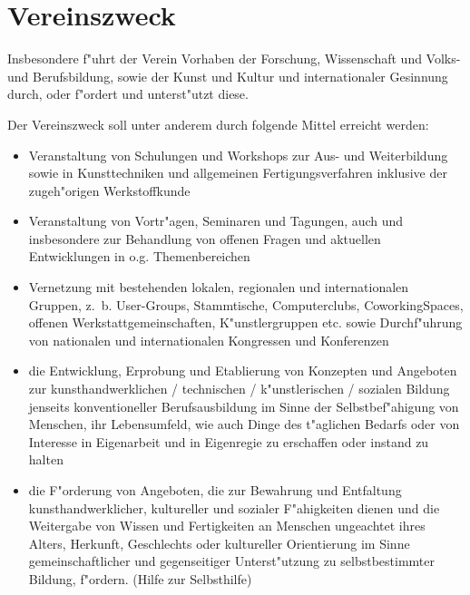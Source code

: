 \documentclass[a5paper, ngerman, 10pt]{scrreprt}
\begin{document}
\section{Vereinszweck}
\begin{compactenum}[(1)]
    \item Insbesondere f"uhrt der Verein Vorhaben der Forschung, Wissenschaft
        und Volks- und Berufsbildung, sowie der Kunst und Kultur und
        internationaler Gesinnung durch, oder f"ordert und unterst"utzt diese.
    \item Der Vereinszweck soll unter anderem durch folgende Mittel erreicht
        werden:
        \begin{itemize}
            \item Veranstaltung von Schulungen und Workshops zur Aus- und
                Weiterbildung sowie in Kunsttechniken und allgemeinen
                Fertigungsverfahren inklusive der zugeh"origen Werkstoffkunde
            \item Veranstaltung von Vortr"agen, Seminaren und Tagungen, auch und
                insbesondere zur Behandlung von offenen Fragen und aktuellen
                Entwicklungen in o.g. Themenbereichen
            \item Vernetzung mit bestehenden lokalen, regionalen und
                internationalen Gruppen, z.~b.  User-Groups, Stammtische,
                Computerclubs, CoworkingSpaces, offenen Werkstattgemeinschaften,
                K"unstlergruppen etc. sowie Durchf"uhrung von nationalen und
                internationalen Kongressen und Konferenzen
            \item die Entwicklung, Erprobung und Etablierung von Konzepten und
                Angeboten zur kunsthandwerklichen / technischen /
                k"unstlerischen / sozialen Bildung jenseits konventioneller
                Berufsausbildung im Sinne der Selbstbef"ahigung von Menschen,
                ihr Lebensumfeld, wie auch Dinge des t"aglichen Bedarfs oder von
                Interesse in Eigenarbeit und in Eigenregie zu erschaffen oder
                instand zu halten
            \item die F"orderung von Angeboten, die zur Bewahrung und Entfaltung
                kunsthandwerklicher, kultureller und sozialer F"ahigkeiten
                dienen und die Weitergabe von Wissen und Fertigkeiten an
                Menschen ungeachtet ihres Alters, Herkunft, Geschlechts oder
                kultureller Orientierung im Sinne gemeinschaftlicher und
                gegenseitiger Unterst"utzung zu selbstbestimmter Bildung,
                f"ordern. (Hilfe zur Selbsthilfe)
        \end{itemize}
\end{compactenum}
\end{document}
